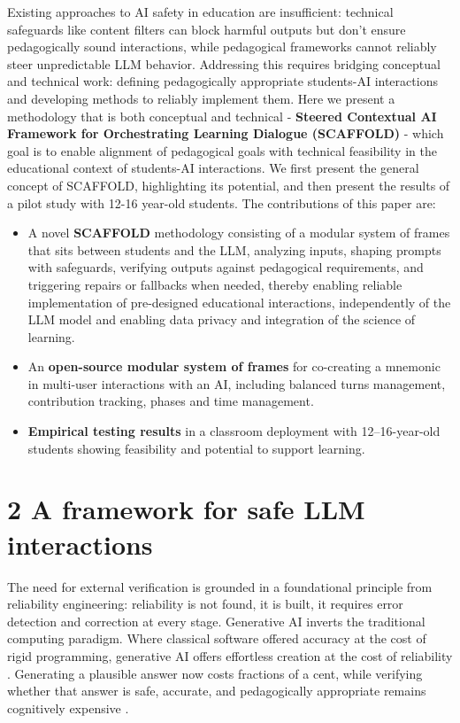 \documentclass[fleqn,10pt]{wlscirep}
\begin{document}
Existing approaches to AI safety in education are insufficient: technical safeguards like content filters can block harmful outputs but don't ensure pedagogically sound interactions, while pedagogical frameworks cannot reliably steer unpredictable LLM behavior. Addressing this requires bridging conceptual and technical work: defining pedagogically appropriate students-AI interactions and developing methods to reliably implement them. Here we present a methodology that is both conceptual and technical - \textbf{Steered Contextual AI Framework for Orchestrating Learning Dialogue (SCAFFOLD)} - which goal is to enable alignment of pedagogical goals with technical feasibility in the educational context of students-AI interactions. We first present the general concept of SCAFFOLD, highlighting its potential, and then present the results of a pilot study with 12-16 year-old students. The contributions of this paper are:

\begin{itemize}
\item A novel \textbf{SCAFFOLD} methodology consisting of a modular system of frames that sits between students and the LLM, analyzing inputs, shaping prompts with safeguards, verifying outputs against pedagogical requirements, and triggering repairs or fallbacks when needed, thereby enabling reliable implementation of pre-designed educational interactions, independently of the LLM model and enabling data privacy and integration of the science of learning.
\item An \textbf{open-source modular system of frames} for co-creating a mnemonic in multi-user interactions with an AI, including balanced turns management, contribution tracking, phases and time management.
\item \textbf{Empirical testing results} in a classroom deployment with 12--16-year-old students showing feasibility and potential to support learning.
\end{itemize}

\section*{2 A framework for safe LLM interactions}

The need for external verification is grounded in a foundational principle from reliability engineering: reliability is not found, it is built, it requires error detection and correction at every stage. Generative AI inverts the traditional computing paradigm. Where classical software offered accuracy at the cost of rigid programming, generative AI offers effortless creation at the cost of reliability \cite{Xu2025, BardynWhitepaper2025}. Generating a plausible answer now costs fractions of a cent, while verifying whether that answer is safe, accurate, and pedagogically appropriate remains cognitively expensive \cite{BardynWhitepaper2025, Xu2025}.
\end{document}
